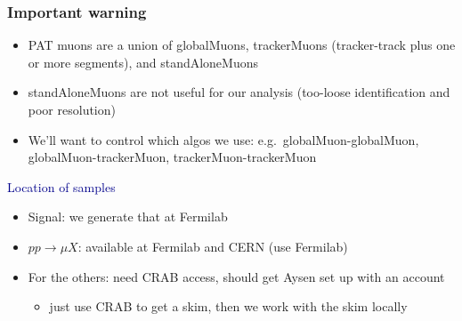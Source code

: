 \documentclass[compress]{beamer}
\begin{document}
\begin{frame}
\frametitle{Important warning}

\begin{itemize}
\item PAT muons are a union of globalMuons, trackerMuons (tracker-track plus one or more segments), and standAloneMuons
\item standAloneMuons are not useful for our analysis (too-loose identification and poor resolution)
\item We'll want to control which algos we use: e.g.\ globalMuon-globalMuon, globalMuon-trackerMuon, trackerMuon-trackerMuon
\end{itemize}

\vspace{0.5 cm}
\hspace{-0.83 cm} \textcolor{darkblue}{\Large Location of samples}
\begin{itemize}
\item Signal: we generate that at Fermilab
\item $pp \to \mu X$: available at Fermilab and CERN (use Fermilab)
\item For the others: need CRAB access, should get Aysen set up with an account
\begin{itemize}
\item just use CRAB to get a skim, then we work with the skim locally
\end{itemize}
\end{itemize}
\end{frame}
\end{document}
